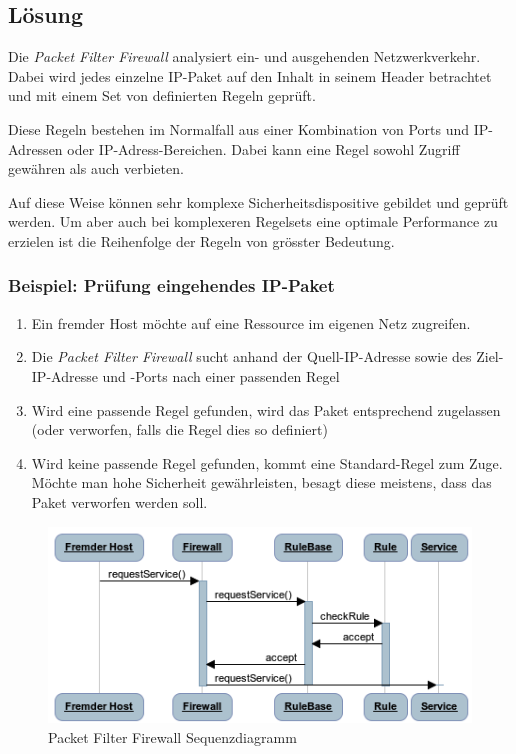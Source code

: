 \subsection*{Lösung}

Die \emph{Packet Filter Firewall} analysiert ein- und ausgehenden Netzwerkverkehr. Dabei wird jedes einzelne IP-Paket auf den Inhalt in seinem Header betrachtet und mit einem Set von definierten Regeln geprüft.

Diese Regeln bestehen im Normalfall aus einer Kombination von Ports und IP-Adressen oder IP-Adress-Bereichen. Dabei kann eine Regel sowohl Zugriff gewähren als auch verbieten.

Auf diese Weise können sehr komplexe Sicherheitsdispositive gebildet und geprüft werden. Um aber auch bei komplexeren Regelsets eine optimale Performance zu erzielen ist die Reihenfolge der Regeln von grösster Bedeutung.

\subsubsection*{Beispiel: Prüfung eingehendes IP-Paket}

\begin{enumerate}
	\item Ein fremder Host möchte auf eine Ressource im eigenen Netz zugreifen.
	\item Die \emph{Packet Filter Firewall} sucht anhand der Quell-IP-Adresse sowie des Ziel-IP-Adresse und -Ports nach einer passenden Regel
	\item Wird eine passende Regel gefunden, wird das Paket entsprechend zugelassen (oder verworfen, falls die Regel dies so definiert)
	\item Wird keine passende Regel gefunden, kommt eine Standard-Regel zum Zuge. Möchte man hohe Sicherheit gewährleisten, besagt diese meistens, dass das Paket verworfen werden soll.
\end{enumerate}

\begin{figure}[H]
	\centering
	\includegraphics[width=12cm]{content/security/firewall-architectures/images/packet-filter-firewall-sequence.png}
	\caption{Packet Filter Firewall Sequenzdiagramm}
\end{figure}

